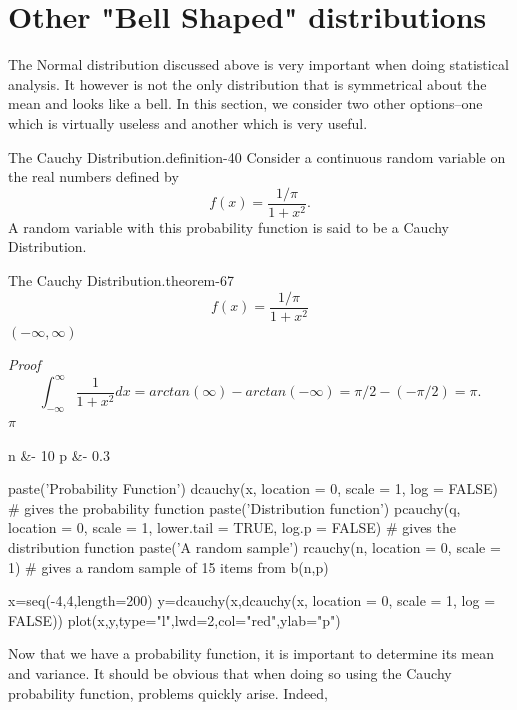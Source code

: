 \documentclass[10pt,]{book}
\makeatletter
\renewcommand*{\proofname}{Proof}
\renewenvironment{proof}[1][\proofname]{\par
  \pushQED{\qed}%
  \normalfont \topsep6\p@\@plus6\p@\relax
  \trivlist
  \item\relax
    {\itshape
    #1\@addpunct{.}}\hspace\labelsep\ignorespaces
}{%
  \popQED\endtrivlist\@endpefalse
}
\numberwithin{equation}{section}
\makeatother
\begin{document}
\section[{Other "Bell Shaped" distributions}]{Other "Bell Shaped" distributions}\label{section-60}
\hypertarget{p-1255}{}%
The Normal distribution discussed above is very important when doing statistical analysis. It however is not the only distribution that is symmetrical about the mean and looks like a bell.  In this section, we consider two other options--one which is virtually useless and another which is very useful.%
\par
\hypertarget{p-1256}{}%
\begin{definition}{The Cauchy Distribution.}{definition-40}%
\hypertarget{p-1257}{}%
Consider a continuous random variable on the real numbers defined by%
\begin{equation*}
f(x) = \frac{1/\pi}{1+x^2}.
\end{equation*}
A random variable with this probability function is said to be a Cauchy Distribution.%
\end{definition}
%
\begin{theorem}{The Cauchy Distribution.}{}{theorem-67}%
%
\begin{equation*}
f(x) = \frac{1/\pi}{1+x^2}
\end{equation*}
\((-\infty, \infty)\)\end{theorem}
\begin{proof}\hypertarget{proof-68}{}
%
\begin{equation*}
\int_{-\infty}^{\infty} \frac{1}{1+x^2} dx = arctan(\infty) - arctan(-\infty) = \pi/2 - (-\pi/2) = \pi.
\end{equation*}
\(\pi\)\end{proof}
\begin{sageinput}
n &- 10
p &- 0.3

paste('Probability Function')
dcauchy(x, location = 0, scale = 1, log = FALSE)   # gives the probability function
paste('Distribution function')
pcauchy(q, location = 0, scale = 1, lower.tail = TRUE, log.p = FALSE)
   # gives the distribution function
paste('A random sample')
rcauchy(n, location = 0, scale = 1)    # gives a random sample of 15 items from b(n,p)

x=seq(-4,4,length=200)
y=dcauchy(x,dcauchy(x, location = 0, scale = 1, log = FALSE))
plot(x,y,type="l",lwd=2,col="red",ylab="p")
\end{sageinput}
\hypertarget{p-1258}{}%
Now that we have a probability function, it is important to determine its mean and variance. It should be obvious that when doing so using the Cauchy probability function, problems quickly arise.  Indeed,%
\end{document}
